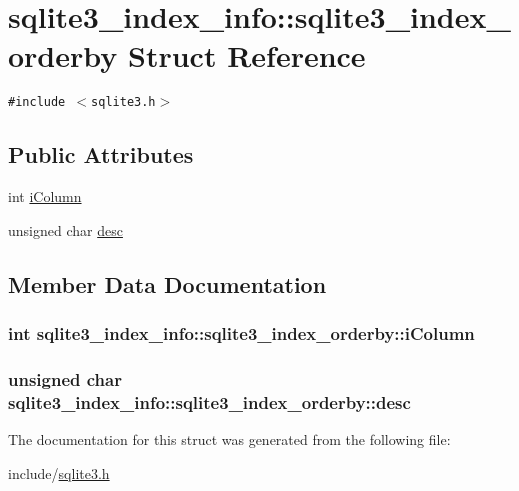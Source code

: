 \hypertarget{structsqlite3__index__info_1_1sqlite3__index__orderby}{
\section{sqlite3\_\-index\_\-info::sqlite3\_\-index\_\-orderby Struct Reference}
\label{structsqlite3__index__info_1_1sqlite3__index__orderby}
}
{\tt \#include $<$sqlite3.h$>$}

\subsection*{Public Attributes}
\begin{CompactItemize}
\item 
int \hyperlink{structsqlite3__index__info_1_1sqlite3__index__orderby_266396085bfda9acef3f13eaa170cd2f}{iColumn}
\item 
unsigned char \hyperlink{structsqlite3__index__info_1_1sqlite3__index__orderby_0586d1b5d36221af96aeba8cfc56e9c6}{desc}
\end{CompactItemize}


\subsection{Member Data Documentation}
\hypertarget{structsqlite3__index__info_1_1sqlite3__index__orderby_266396085bfda9acef3f13eaa170cd2f}{
\subsubsection[iColumn]{\setlength{\rightskip}{0pt plus 5cm}int {\bf sqlite3\_\-index\_\-info::sqlite3\_\-index\_\-orderby::iColumn}}}
\label{structsqlite3__index__info_1_1sqlite3__index__orderby_266396085bfda9acef3f13eaa170cd2f}


\hypertarget{structsqlite3__index__info_1_1sqlite3__index__orderby_0586d1b5d36221af96aeba8cfc56e9c6}{
\subsubsection[desc]{\setlength{\rightskip}{0pt plus 5cm}unsigned char {\bf sqlite3\_\-index\_\-info::sqlite3\_\-index\_\-orderby::desc}}}
\label{structsqlite3__index__info_1_1sqlite3__index__orderby_0586d1b5d36221af96aeba8cfc56e9c6}




The documentation for this struct was generated from the following file:\begin{CompactItemize}
\item 
include/\hyperlink{sqlite3_8h}{sqlite3.h}\end{CompactItemize}
